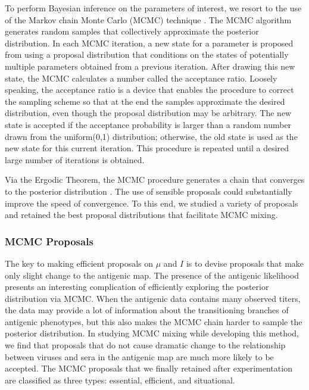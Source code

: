\documentclass[11pt,oneside,letterpaper]{article}
\begin{document}
To perform Bayesian inference on the parameters of interest, we resort to the use of the Markov chain Monte Carlo (MCMC) technique \cite{hastings_monte_1970, metropolis_equation_1953}.
The MCMC algorithm generates random samples that collectively approximate the posterior distribution.
In each MCMC iteration, a new state for a parameter is proposed from using a proposal distribution that conditions on the states of potentially multiple parameters obtained from a previous iteration.
After drawing this new state, the MCMC calculates a number called the acceptance ratio.
Loosely speaking, the acceptance ratio is a device that enables the procedure to correct the sampling scheme so that at the end the samples approximate the desired distribution, even though the proposal distribution may be arbitrary.
The new state is accepted if the acceptance probability is larger than a random number drawn from the uniform(0,1) distribution; otherwise, the old state is used as the new state for this current iteration.
This procedure is repeated until a desired large number of iterations is obtained.


Via the Ergodic Theorem, the MCMC procedure generates a chain that converges to the posterior distribution \cite{hastings_monte_1970}. %
The use of sensible proposals could substantially improve the speed of convergence.
To this end, we studied a variety of proposals and retained the best proposal distributions that facilitate MCMC mixing.


\subsubsection*{MCMC Proposals}



The key to making efficient proposals on $\mu$ and $I$ is to devise proposals that make only slight change to the antigenic map.
The presence of the antigenic likelihood presents an interesting complication of efficiently exploring the posterior distribution via MCMC.
When the antigenic data contains many observed titers, the data may provide a lot of information about the transitioning branches of antigenic phenotypes, but this also makes the MCMC chain harder to sample the posterior distribution.
In studying MCMC mixing while developing this method, we find that proposals that do not cause dramatic change to the relationship between viruses and sera in the antigenic map are much more likely to be accepted.
The MCMC proposals that we finally retained after experimentation are classified as three types: essential, efficient, and situational. 
\end{document}
